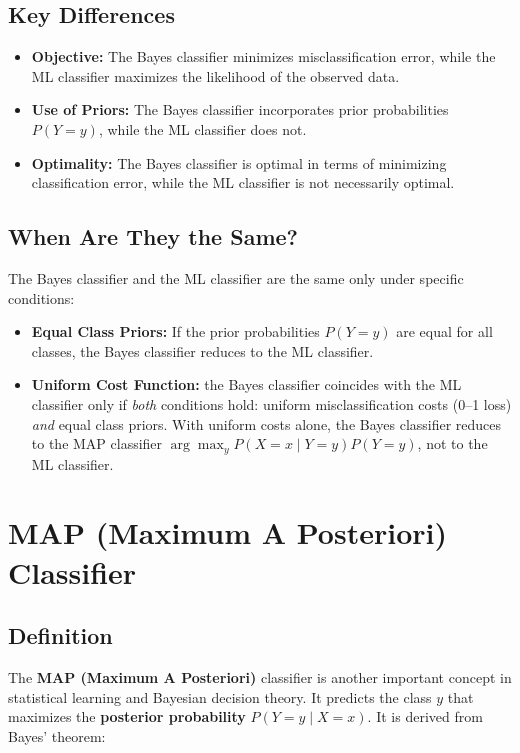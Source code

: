 \begin{notechapter}
\subsection{Key Differences}
\begin{itemize}
    \item \textbf{Objective:} The Bayes classifier minimizes misclassification error, while the ML classifier maximizes the likelihood of the observed data.
    \item \textbf{Use of Priors:} The Bayes classifier incorporates prior probabilities \( P(Y = y) \), while the ML classifier does not.
    \item \textbf{Optimality:} The Bayes classifier is optimal in terms of minimizing classification error, while the ML classifier is not necessarily optimal.
\end{itemize}

\subsection{When Are They the Same?}
The Bayes classifier and the ML classifier are the same only under specific conditions:
\begin{itemize}
    \item \textbf{Equal Class Priors:} If the prior probabilities \( P(Y = y) \) are equal for all classes, the Bayes classifier reduces to the ML classifier.
    \item \textbf{Uniform Cost Function:} the Bayes classifier coincides with the ML classifier only if \emph{both} conditions hold: uniform misclassification costs (0--1 loss) \emph{and} equal class priors. With uniform costs alone, the Bayes classifier reduces to the MAP classifier $\arg\max_y P(X=x\mid Y=y)P(Y=y)$, not to the ML classifier.
\end{itemize}

\section{MAP (Maximum A Posteriori) Classifier}

\subsection{Definition}
The \textbf{MAP (Maximum A Posteriori)} classifier is another important concept in statistical learning and Bayesian decision theory. It predicts the class \( y \) that maximizes the \textbf{posterior probability} \( P(Y = y \mid X = x) \). It is derived from Bayes' theorem:


\end{notechapter}
